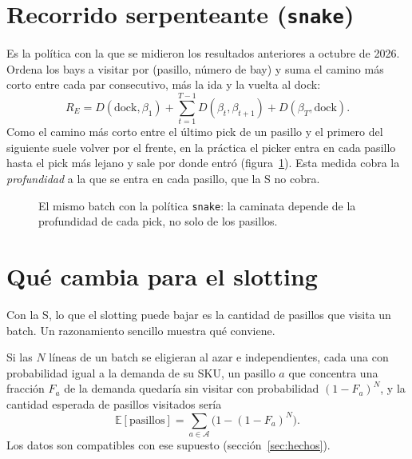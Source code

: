 \documentclass[11pt,a4paper,oneside]{report}
\newcommand{\code}[1]{\texttt{\small #1}}
\newcommand{\Aisles}{\mathcal{A}}
\begin{document}
\section{Recorrido serpenteante (\code{snake})}

Es la política con la que se midieron los resultados anteriores a octubre de 2026. Ordena los
bays a visitar por (pasillo, número de bay) y suma el camino más corto entre cada par
consecutivo, más la ida y la vuelta al dock:
\begin{equation}
R_E = D(\text{dock}, \beta_1) + \sum_{t=1}^{T-1} D(\beta_t, \beta_{t+1}) + D(\beta_T, \text{dock}).
\end{equation}
Como el camino más corto entre el último pick de un pasillo y el primero del siguiente suele
volver por el frente, en la práctica el picker entra en cada pasillo hasta el pick más lejano y
sale por donde entró (figura~\ref{fig:snake}). Esta medida cobra la \emph{profundidad} a la que
se entra en cada pasillo, que la S no cobra.

\begin{figure}[ht]
\centering
{}
\caption{El mismo batch con la política \code{snake}: la caminata depende de la profundidad
de cada pick, no solo de los pasillos.}
\label{fig:snake}
\end{figure}

\section{Qué cambia para el slotting}

Con la S, lo que el slotting puede bajar es la cantidad de pasillos que visita un batch. Un
razonamiento sencillo muestra qué conviene.

\begin{supuesto}
Si las $N$ líneas de un batch se eligieran al azar e independientes, cada una con probabilidad
igual a la demanda de su SKU, un pasillo $a$ que concentra una fracción $F_a$ de la demanda
quedaría sin visitar con probabilidad $(1 - F_a)^N$, y la cantidad esperada de pasillos
visitados sería
\[
\mathbb{E}[\text{pasillos}] = \sum_{a \in \Aisles} \bigl(1 - (1 - F_a)^N\bigr).
\]
Los datos son compatibles con ese supuesto (sección~\ref{sec:hechos}).
\end{supuesto}
\end{document}

